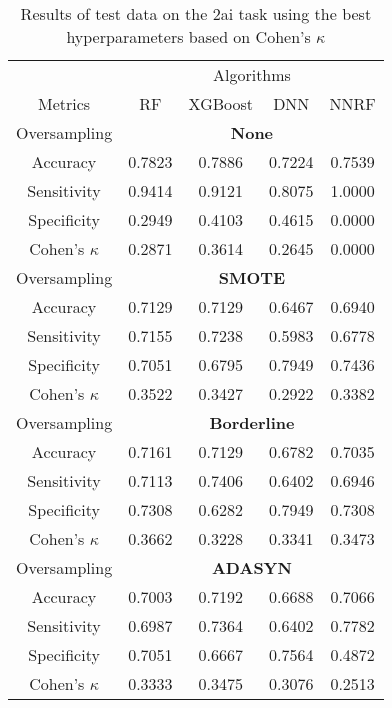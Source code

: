 \begin{table}[!htb]
\centering
\caption{Results of test data on the 2ai task using the best hyperparameters based on Cohen's $\kappa$}
\label{tab:2ai_test_results}
\begin{tabular}{c | c c c c}
\hline
 & \multicolumn{4}{c}{Algorithms}\\ 
Metrics &RF & XGBoost & DNN & NNRF\\ 
\hline
Oversampling &\multicolumn{4}{|c}{\textbf{None}}\\ 
\hline
Accuracy & 0.7823 & 0.7886 & 0.7224 & 0.7539\\ 
Sensitivity & 0.9414 & 0.9121 & 0.8075 & 1.0000\\ 
Specificity & 0.2949 & 0.4103 & 0.4615 & 0.0000\\ 
Cohen's $\kappa$ & 0.2871 & 0.3614 & 0.2645 & 0.0000\\ 
\hline
Oversampling &\multicolumn{4}{|c}{\textbf{SMOTE}}\\ 
\hline
Accuracy & 0.7129 & 0.7129 & 0.6467 & 0.6940\\ 
Sensitivity & 0.7155 & 0.7238 & 0.5983 & 0.6778\\ 
Specificity & 0.7051 & 0.6795 & 0.7949 & 0.7436\\ 
Cohen's $\kappa$ & 0.3522 & 0.3427 & 0.2922 & 0.3382\\ 
\hline
Oversampling &\multicolumn{4}{|c}{\textbf{Borderline}}\\ 
\hline
Accuracy & 0.7161 & 0.7129 & 0.6782 & 0.7035\\ 
Sensitivity & 0.7113 & 0.7406 & 0.6402 & 0.6946\\ 
Specificity & 0.7308 & 0.6282 & 0.7949 & 0.7308\\ 
Cohen's $\kappa$ & 0.3662 & 0.3228 & 0.3341 & 0.3473\\ 
\hline
Oversampling &\multicolumn{4}{|c}{\textbf{ADASYN}}\\ 
\hline
Accuracy & 0.7003 & 0.7192 & 0.6688 & 0.7066\\ 
Sensitivity & 0.6987 & 0.7364 & 0.6402 & 0.7782\\ 
Specificity & 0.7051 & 0.6667 & 0.7564 & 0.4872\\ 
Cohen's $\kappa$ & 0.3333 & 0.3475 & 0.3076 & 0.2513\\ 
\hline
\end{tabular}
\end{table}


